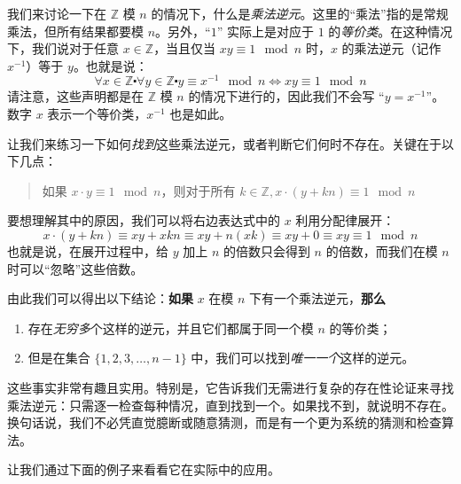 我们来讨论一下在 $\mathbb{Z}$ 模 $n$ 的情况下，什么是\emph{乘法逆元}。这里的``乘法''指的是常规乘法，但所有结果都要模 $n$。另外，``$1$'' 实际上是对应于 $1$ 的\emph{等价类}。在这种情况下，我们说对于任意 $x \in \mathbb{Z}$，当且仅当 $xy \equiv 1 \mod n$ 时，$x$ 的乘法逆元（记作 $x^{-1}$）等于 $y$。也就是说：
\[\forall x \in \mathbb{Z} \centerdot \forall y \in \mathbb{Z} \centerdot y \equiv x^{-1} \mod n \iff xy \equiv 1 \mod n\]
请注意，这些声明都是在 $\mathbb{Z}$ 模 $n$ 的情况下进行的，因此我们不会写 ``$y = x^{-1}$''。数字 $x$ 表示一个等价类，$x^{-1}$ 也是如此。

让我们来练习一下如何\emph{找到}这些乘法逆元，或者判断它们何时不存在。关键在于以下几点：
\begin{quotation}
    如果 $x \cdot y \equiv 1 \mod n$，则对于所有 $k \in \mathbb{Z}, x \cdot (y+kn) \equiv 1 \mod n$
\end{quotation}
要想理解其中的原因，我们可以将右边表达式中的 $x$ 利用分配律展开：
\[x \cdot (y+kn) \equiv xy+xkn \equiv xy+n(xk) \equiv xy+0 \equiv xy \equiv 1 \mod n\]
也就是说，在展开过程中，给 $y$ 加上 $n$ 的倍数只会得到 $n$ 的倍数，而我们在模 $n$ 时可以``忽略''这些倍数。

由此我们可以得出以下结论：\textbf{如果} $x$ 在模 $n$ 下有一个乘法逆元，\textbf{那么} 
\begin{enumerate}[label=(\alph*)]
    \item 存在\emph{无穷多}个这样的逆元，并且它们都属于同一个模 $n$ 的等价类；
    \item 但是在集合 $\{1, 2, 3, \dots , n-1\}$ 中，我们可以找到\emph{唯一一个}这样的逆元。
\end{enumerate}

这些事实非常有趣且实用。特别是，它告诉我们无需进行复杂的存在性论证来寻找乘法逆元：只需逐一检查每种情况，直到找到一个。如果找不到，就说明不存在。换句话说，我们不必凭直觉臆断或随意猜测，而是有一个更为系统的猜测和检查算法。

让我们通过下面的例子来看看它在实际中的应用。\\

